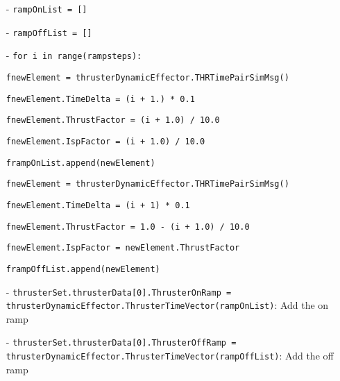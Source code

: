 \begin{itemize}
 \item[-]      \texttt{rampOnList = []}
 \item[-]      \texttt{rampOffList = []}

 \item[-]      \texttt{for i in range(rampsteps):}
 
\hspace{2cm}\texttt{fnewElement = thrusterDynamicEffector.THRTimePairSimMsg()}

\hspace{2cm}\texttt{fnewElement.TimeDelta = (i + 1.) * 0.1}

\hspace{2cm}\texttt{fnewElement.ThrustFactor = (i + 1.0) / 10.0}

\hspace{2cm}\texttt{fnewElement.IspFactor = (i + 1.0) / 10.0}

\hspace{2cm}\texttt{frampOnList.append(newElement)}

\hspace{2cm}\texttt{fnewElement = thrusterDynamicEffector.THRTimePairSimMsg()}

\hspace{2cm}\texttt{fnewElement.TimeDelta = (i + 1) * 0.1}

\hspace{2cm}\texttt{fnewElement.ThrustFactor = 1.0 - (i + 1.0) / 10.0}

 \hspace{2cm}\texttt{fnewElement.IspFactor = newElement.ThrustFactor}
 
 \hspace{2cm}\texttt{frampOffList.append(newElement)}

 \item[-]      \texttt{thrusterSet.thrusterData[0].ThrusterOnRamp = thrusterDynamicEffector.ThrusterTimeVector(rampOnList)}: Add the on ramp
 \item[-]      \texttt{thrusterSet.thrusterData[0].ThrusterOffRamp = thrusterDynamicEffector.ThrusterTimeVector(rampOffList)}: Add the off ramp
            
            \end{itemize}
